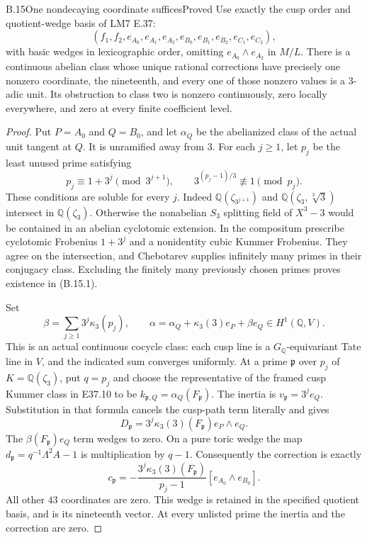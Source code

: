 \begin{statement}{B.15}{One nondecaying coordinate suffices}{Proved}
Use exactly the cusp order and quotient-wedge basis of LM7 E.37:
\[
 (f_1,f_2,e_{A_0},e_{A_1},e_{A_2},e_{B_0},e_{B_1},e_{B_2},
 e_{C_1},e_{C_2}),
\]
with basic wedges in lexicographic order, omitting
$e_{A_0}\wedge e_{A_2}$ in $M/L$. There is a continuous abelian
class whose unique rational corrections have precisely one
nonzero coordinate, the nineteenth, and every one of those
nonzero values is a $3$-adic unit. Its obstruction to class two
is nonzero continuously, zero locally everywhere, and zero at
every finite coefficient level.
\end{statement}
\begin{proof}
Put $P=A_0$ and $Q=B_0$, and let $\alpha_Q$ be the abelianized
class of the actual unit tangent at $Q$. It is unramified away
from $3$. For each $j\geq1$, let $p_j$ be the least unused prime
satisfying
\[
 p_j\equiv1+3^j\pmod{3^{j+1}},\qquad
                     3^{(p_j-1)/3}\not\equiv1\pmod{p_j}.          \tag{B.15.1}
\]
These conditions are soluble for every $j$. Indeed
$\mathbb Q(\zeta_{3^{j+1}})$ and
$\mathbb Q(\zeta_3,\sqrt[3]{3})$ intersect in
$\mathbb Q(\zeta_3)$. Otherwise the nonabelian $S_3$ splitting
field of $X^3-3$ would be contained in an abelian cyclotomic
extension. In the compositum prescribe cyclotomic Frobenius
$1+3^j$ and a nonidentity cubic Kummer Frobenius. They agree on
the intersection, and Chebotarev supplies infinitely many primes
in their conjugacy class. Excluding the finitely many previously
chosen primes proves existence in (B.15.1).

Set
\[
 \beta=\sum_{j\geq1}3^j\kappa_3(p_j),\qquad
 \alpha=\alpha_Q+\kappa_3(3)e_P+\beta e_Q
                   \in H^1(\mathbb Q,V).                         \tag{B.15.2}
\]
This is an actual continuous cocycle class: each cusp line is a
$G_{\mathbb Q}$-equivariant Tate line in $V$, and the indicated
sum converges uniformly. At a prime $\mathfrak p$ over $p_j$ of
$K=\mathbb Q(\zeta_3)$, put $q=p_j$ and choose the representative
of the framed cusp Kummer class in E37.10 to be
$k_{\mathfrak p,Q}=\alpha_Q(F_{\mathfrak p})$. The inertia is
$v_{\mathfrak p}=3^je_Q$. Substitution in that formula cancels
the cusp-path term literally and gives
\[
 D_{\mathfrak p}=3^j\kappa_3(3)(F_{\mathfrak p})
                       e_P\wedge e_Q.                            \tag{B.15.3}
\]
The $\beta(F_{\mathfrak p})e_Q$ term wedges to zero. On a pure
toric wedge the map $d_{\mathfrak p}=q^{-1}\Lambda^2A-1$ is
multiplication by $q-1$. Consequently the correction is exactly
\[
 c_{\mathfrak p}=
 -\frac{3^j\kappa_3(3)(F_{\mathfrak p})}{p_j-1}
                          [e_{A_0}\wedge e_{B_0}].                \tag{B.15.4}
\]
All other $43$ coordinates are zero. This wedge is retained in
the specified quotient basis, and is its nineteenth vector.
At every unlisted prime the inertia and the correction are zero.


\end{proof}
